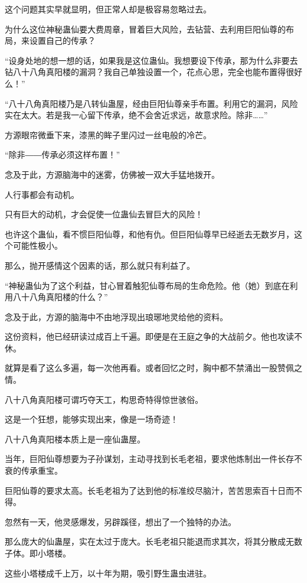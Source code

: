 
\begin{this_body}

这个问题其实早就显明，但正常人却是极容易忽略过去。

为什么这位神秘蛊仙要大费周章，冒着巨大风险，去钻营、去利用巨阳仙尊的布局，来设置自己的传承？

“设身处地的想一想的话，如果我是这位蛊仙。我想要设下传承，那为什么非要去钻八十八角真阳楼的漏洞？我自己单独设置一个，花点心思，完全也能布置得很好么！”

“八十八角真阳楼乃是八转仙蛊屋，经由巨阳仙尊亲手布置。利用它的漏洞，风险实在太大。若是我一心留下传承，绝不会舍近求远，故意求险。除非……”

方源眼帘微垂下来，漆黑的眸子里闪过一丝电般的冷芒。

“除非――传承必须这样布置！”

念及于此，方源脑海中的迷雾，仿佛被一双大手猛地拨开。

人行事都会有动机。

只有巨大的动机，才会促使一位蛊仙去冒巨大的风险！

也许这个蛊仙，看不惯巨阳仙尊，和他有仇。但巨阳仙尊早已经逝去无数岁月，这个可能性极小。

那么，抛开感情这个因素的话，那么就只有利益了。

“神秘蛊仙为了这个利益，甘心冒着触犯仙尊布局的生命危险。他（她）到底在利用八十八角真阳楼的什么？”

念及于此，方源的脑海中不由地浮现出琅琊地灵给他的资料。

这份资料，他已经研读过成百上千遍。即便是在王庭之争的大战前夕。他也攻读不休。

就算是看了这么多遍，每一次他再看。或者回忆之时，胸中都不禁涌出一股赞佩之情。

八十八角真阳楼可谓巧夺天工，构思奇特得惊世骇俗。

这是一个狂想，能够实现出来，像是一场奇迹！

八十八角真阳楼本质上是一座仙蛊屋。

当年，巨阳仙尊想要为子孙谋划，主动寻找到长毛老祖，要求他炼制出一件长存不衰的传承重宝。

巨阳仙尊的要求太高。长毛老祖为了达到他的标准绞尽脑汁，苦苦思索百十日而不得。

忽然有一天，他灵感爆发，另辟蹊径，想出了一个独特的办法。

那么庞大的仙蛊屋，实在太过于庞大。长毛老祖只能退而求其次，将其分散成无数子体。即小塔楼。

这些小塔楼成千上万，以十年为期，吸引野生蛊虫进驻。


\end{this_body}
